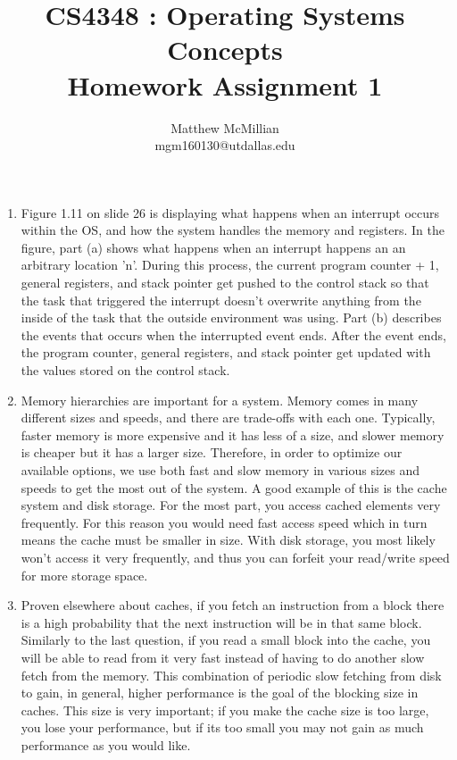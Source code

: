 \documentclass[12pt]{article}
\begin{document}
\title{CS4348 : Operating Systems Concepts\\Homework Assignment 1}
\author{Matthew McMillian\\mgm160130@utdallas.edu}
\maketitle

\begin{enumerate}
	
	\item Figure 1.11 on slide 26 is displaying what happens when an interrupt occurs 			within the OS, and how the system handles the memory and registers. In the figure, 			part (a) shows what happens when an interrupt happens an an arbitrary location 'n'. 		During this process, the current program counter + 1, general registers, and stack 			pointer get pushed to the control stack so that the task that triggered the interrupt 		doesn't overwrite anything from the inside of the task that the outside environment 		was using. Part (b) describes the events that occurs when the interrupted event ends. 		After the event ends, the program counter, general registers, and stack pointer get 		updated with the values stored on the control stack.

	\item Memory hierarchies are important for a system. Memory comes in many different 		sizes and speeds, and there are trade-offs with each one. Typically, faster memory is 		more expensive and it has less of a size, and slower memory is cheaper but it has a 		larger size. Therefore, in order to optimize our available options, we use both fast 		and slow memory in various sizes and speeds to get the most out of the system. A good 		example of this is the cache system and disk storage. For the most part, you access 		cached elements very frequently. For this reason you would need fast access speed 			which in turn means the cache must be smaller in size. With disk storage, you most 			likely won't access it very frequently, and thus you can forfeit your read/write speed 	for more storage space.

	\item Proven elsewhere about caches, if you fetch an instruction from a block there is 	a high probability that the next instruction will be in that same block. Similarly to 		the last question, if you read a small block into the cache, you will be able to read 		from it very fast instead of having to do another slow fetch from the memory. This 			combination of periodic slow fetching from disk to gain, in general, higher 				performance is the goal of the blocking size in caches. This size is very important; 		if you make the cache size is too large, you lose your performance, but if its too 			small you may not gain as much performance as you would like.


\end{enumerate}
\end{document}
